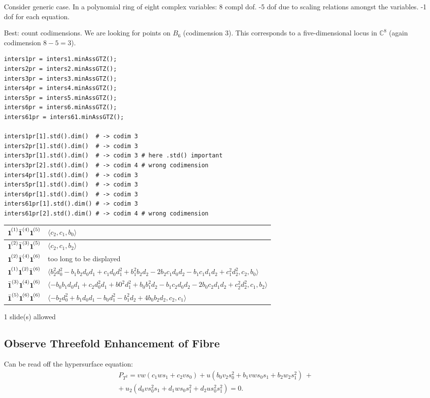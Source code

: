 \documentclass[11pt,a4paper,english]{scrartcl}
\newcommand{\C}{\mathbb{C}}
\newcommand\mc[1]{{\vphantom{\bar{\boldsymbol{1}}}\boldsymbol{1}}^{\mkern-2mu (#1)}}
\newcommand{\mcb}[1]{\bar{\boldsymbol{1}}^{(#1)}}
\newcommand{\ya}{\mc{1}\mcb{4}\mc{5}}
\newcommand{\yb}{\mc{2}\mcb{3}\mc{5}}
\newcommand{\yc}{\mc{2}\mcb{4}\mc{6}}
\newcommand{\yd}{\mc{1}\mc{2}\mcb{6}}
\newcommand{\ye}{\mcb{3}\mc{4}\mc{6}}
\newcommand{\yfs}{\mcb{5}\mc{6}\mc{6}}
\newcommand{\needSlides}[1]{\newpage \begin{needSl}#1 slide(s) allowed\end{needSl}}
\begin{document}
Consider generic case. In a polynomial ring of eight complex variables: 8 compl dof. -5 dof due to scaling relations amongst the variables. -1 dof for each equation.

Best: count codimensions. We are looking for points on $B_6$ (codimension 3). This corresponds to a five-dimensional locus in $\C^8$ (again codimension $8-5=3$).
\begin{lstlisting}
inters1pr = inters1.minAssGTZ();
inters2pr = inters2.minAssGTZ();
inters3pr = inters3.minAssGTZ();
inters4pr = inters4.minAssGTZ();
inters5pr = inters5.minAssGTZ();
inters6pr = inters6.minAssGTZ();
inters61pr = inters61.minAssGTZ();

inters1pr[1].std().dim()  # -> codim 3
inters2pr[1].std().dim()  # -> codim 3
inters3pr[1].std().dim()  # -> codim 3 # here .std() important
inters3pr[2].std().dim()  # -> codim 4 # wrong codimension
inters4pr[1].std().dim()  # -> codim 3
inters5pr[1].std().dim()  # -> codim 3
inters6pr[1].std().dim()  # -> codim 3
inters61pr[1].std().dim() # -> codim 3
inters61pr[2].std().dim() # -> codim 4 # wrong codimension
\end{lstlisting}

\begin{center}
\begin{tabular}{l|p{10cm}}
\toprule
$\ya$ & $\langle c_2,c_1,b_0 \rangle$\\
\midrule
$\yb$ & $\langle c_2,c_1,b_2 \rangle$\\
\midrule
$\yc$ & too long to be displayed\\
\midrule
$\yd$ & $\langle b_2^2 d_0^2-b_1 b_2 d_0 d_1+c_1 d_0 d_1^2+b_1^2 b_2 d_2-2 b_2 c_1 d_0 d_2-b_1 c_1 d_1 d_2+c_1^2 d_2^2,c_2,b_0\rangle$\\
\midrule
$\ye$ & $\langle-b_0 b_1 d_0 d_1+c_2 d_0^2 d_1+b0^2 d_1^2+b_0 b_1^2 d_2-b_1 c_2 d_0 d_2-2 b_0 c_2 d_1 d_2+c_2^2 d_2^2,c_1,b_2\rangle$\\
\midrule
$\yfs$ & $\langle -b_2 d_0^2+b_1 d_0 d_1-b_0 d_1^2-b_1^2 d_2+4 b_0 b_2 d_2,c_2,c_1\rangle$\\
\bottomrule
\end{tabular}
\end{center}

\needSlides{1}
\subsection{Observe Threefold Enhancement of Fibre}
Can be read off the hypersurface equation:
\begin{gather*}
P_{T^2} = vw(c_1ws_1+c_2vs_0)+u(b_0v_2s^2_0+b_1vws_0s_1+b_2w_2s^2_1 )\: +  \\
 + \: u_2(d_0vs^2_0s_1 +d_1ws_0s^2_1 +d_2us^2_0s^2_1)=0.
\end{gather*}
\end{document}
